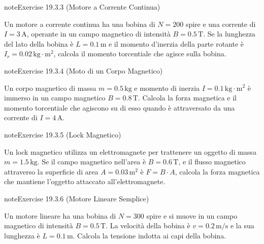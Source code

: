 \documentclass[letterpaper,10pt,italian]{jupyterBook}
\begin{document}
\begin{sphinxadmonition}{note}{Exercise 19.3.3 (Motore a Corrente Continua)}



\sphinxAtStartPar
Un motore a corrente continua ha una bobina di \(N = 200\) spire e una corrente di \(I = 3 \, \text{A}\), operante in un campo magnetico di intensità \(B = 0.5 \, \text{T}\). Se la lunghezza del lato della bobina è \(L = 0.1 \, \text{m}\) e il momento d’inerzia della parte rotante è \(I_r = 0.02 \, \text{kg} \cdot \text{m}^2\), calcola il momento torcentiale che agisce sulla bobina.
\end{sphinxadmonition}
 \label{exercise:ch/electromagnetism/electric-machines-problems-exercise-3}

\begin{sphinxadmonition}{note}{Exercise 19.3.4 (Moto di un Corpo Magnetico)}



\sphinxAtStartPar
Un corpo magnetico di massa \(m = 0.5 \, \text{kg}\) e momento di inerzia \(I = 0.1 \, \text{kg} \cdot \text{m}^2\) è immerso in un campo magnetico \(B = 0.8 \, \text{T}\). Calcola la forza magnetica e il momento torcentiale che agiscono su di esso quando è attraversato da una corrente di \(I = 4 \, \text{A}\).
\end{sphinxadmonition}
 \label{exercise:ch/electromagnetism/electric-machines-problems-exercise-4}

\begin{sphinxadmonition}{note}{Exercise 19.3.5 (Lock Magnetico)}



\sphinxAtStartPar
Un lock magnetico utilizza un elettromagnete per trattenere un oggetto di massa \(m = 1.5 \, \text{kg}\). Se il campo magnetico nell’area è \(B = 0.6 \, \text{T}\), e il flusso magnetico attraverso la superficie di area \(A = 0.03 \, \text{m}^2\) è \(F = B \cdot A\), calcola la forza magnetica che mantiene l’oggetto attaccato all’elettromagnete.
\end{sphinxadmonition}
 \label{exercise:ch/electromagnetism/electric-machines-problems-exercise-5}

\begin{sphinxadmonition}{note}{Exercise 19.3.6 (Motore Lineare Semplice)}



\sphinxAtStartPar
Un motore lineare ha una bobina di \(N = 300\) spire e si muove in un campo magnetico di intensità \(B = 0.5 \, \text{T}\). La velocità della bobina è \(v = 0.2 \, \text{m/s}\) e la sua lunghezza è \(L = 0.1 \, \text{m}\). Calcola la tensione indotta ai capi della bobina.
\end{sphinxadmonition}
 \label{exercise:ch/electromagnetism/electric-machines-problems-exercise-6}
\end{document}
